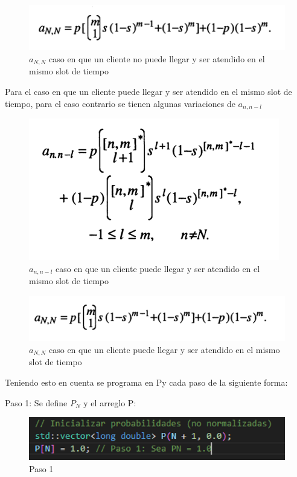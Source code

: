 \documentclass{article}
\begin{document}
\begin{figure} [H]
    \centering
    \includegraphics[width=0.5\linewidth]{images/imageGeoGeoMCalc2.png}
    \caption{$a_{N,N}$ caso en que un cliente no puede llegar y ser atendido en el mismo slot de tiempo}
    \label{fig:enter-label}
\end{figure}

Para el caso en que un cliente puede llegar y ser atendido en el mismo slot de tiempo, para el caso contrario se tienen algunas variaciones de $a_{n,n-l}$

\begin{figure}[H]
    \centering
    \includegraphics[width=0.5\linewidth]{images/imageGeoGeoMCalc3.png}
    \caption{$a_{n,n-l}$ caso en que un cliente puede llegar y ser atendido en el mismo slot de tiempo}
    \label{fig:enter-label}
\end{figure}

\begin{figure}[H]
    \centering
    \includegraphics[width=0.5\linewidth]{images/imageGeoGeoMCalc4.png}
    \caption{$a_{N,N}$ caso en que un cliente puede llegar y ser atendido en el mismo slot de tiempo}
    \label{fig:enter-label}
\end{figure}

Teniendo esto en cuenta se programa en Py cada paso de la siguiente forma:

Paso 1: Se define $P_N$ y el arreglo P:
\begin{figure}[H]
    \centering
    \includegraphics[width=0.5\linewidth]{images/imageGeoGeoMCalc5.png}
    \caption{Paso 1}
    \label{fig:enter-label}
\end{figure}
\end{document}
